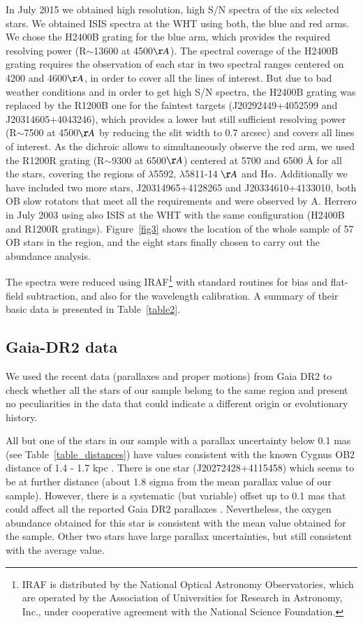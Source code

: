 \documentclass{aa} %
\begin{document}
 In July 2015 we obtained high resolution, high S/N spectra of the six selected stars. We obtained ISIS spectra at the WHT using both, the blue and red arms. We chose the H2400B grating for the blue arm, which provides the required resolving power (R$\sim$13600 at 4500$\AA$).
The spectral coverage of the H2400B grating requires the observation of each star in two spectral ranges centered on 4200 and 4600$\AA$, in order to cover all the lines of interest. But due to bad weather conditions and in order to get high S/N spectra, the H2400B grating was replaced by the R1200B one for the faintest targets (J20292449+4052599 and J20314605+4043246), which provides a lower but still sufficient resolving power (R$\sim$7500 at 4500$\AA$ by reducing the slit width to 0.7 arcsec) and covers all lines of interest. As the dichroic allows to simultaneously observe the red arm, we used the R1200R grating (R$\sim$9300 at 6500$\AA$) centered at 5700 and 6500 Å for all the stars, covering the regions of  $\lambda$5592,  $\lambda$5811-14 $\AA$ and H$\alpha$. 
Additionally we have included two more stars, J20314965+4128265 and J20334610+4133010, both OB slow rotators that meet all the requirements and were observed by A. Herrero in July 2003 using also ISIS at the WHT with the same configuration (H2400B and R1200R gratings).
 Figure~\ref{fig3} shows the location of the whole sample of 57 OB stars in the region, and the eight stars finally chosen to carry out the abundance analysis.

The spectra were reduced using IRAF\footnote{IRAF is distributed by the National Optical Astronomy Observatories, which are operated by the Association of Universities for Research in Astronomy, Inc., under cooperative agreement with the National Science Foundation.} with standard routines for bias and flat-field subtraction, and also for the wavelength calibration.  A summary of their basic data is presented in Table~\ref{table2}.




\subsection{Gaia-DR2 data}\label{sect42}
 
We used the recent data (parallaxes and proper motions) from Gaia DR2 to check whether all the stars of our sample belong to the same region and present no peculiarities in the data that could indicate a different origin or evolutionary history.

All but one of the stars in our sample  with a parallax uncertainty below 0.1 mas (see Table~\ref{table_distances}) have values consistent with the known Cygnus OB2 distance of 1.4 - 1.7 kpc \citep{mt91, hanson03,rygl12}. There is one star (J20272428+4115458) which seems to be at further distance (about 1.8 sigma from the mean parallax value of our sample). 
However, there is a systematic (but variable) offset up to 0.1 mas that could affect all the reported Gaia DR2 parallaxes \citep{arenou18,lindegren18,stassun18}. Nevertheless, the oxygen abundance obtained for this star is consistent with the mean value obtained for the sample. 
Other two stars have large parallax uncertainties, but still consistent with the average value.
\end{document}
